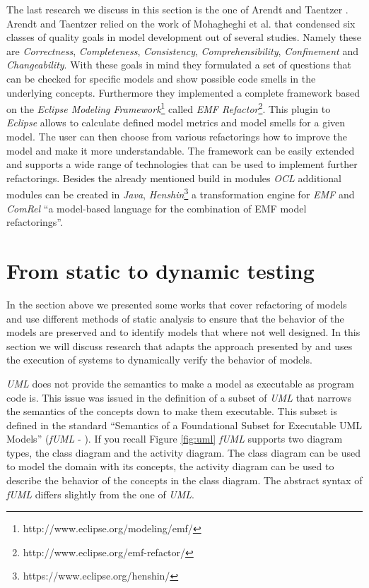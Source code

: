 \documentclass{llncs}
\begin{document}
The last research we discuss in this section is the one of Arendt and Taentzer \cite{DBLP:conf/models/ArendtTW13}. Arendt and Taentzer relied on the work of Mohagheghi et al. \cite{DBLP:journals/infsof/MohagheghiDN09} that condensed six classes of quality goals in model development out of several studies. Namely these are \textit{Correctness}, \textit{Completeness}, \textit{Consistency}, \textit{Comprehensibility}, \textit{Confinement} and \textit{Changeability}. With these goals in mind they formulated a set of questions that can be checked for specific models and show possible code smells in the underlying concepts. Furthermore they implemented a complete framework based on the \textit{Eclipse Modeling Framework}\footnote{http://www.eclipse.org/modeling/emf/} called \textit{EMF Refactor}\footnote{http://www.eclipse.org/emf-refactor/}. This plugin to \textit{Eclipse} allows to calculate defined model metrics and model smells for a given model. The user can then choose from various refactorings how to improve the model and make it more understandable. The framework can be easily extended and supports a wide range of technologies that can be used to implement further refactorings. Besides the already mentioned build in modules \textit{OCL} additional modules can be created in \textit{Java}, \textit{Henshin}\footnote{https://www.eclipse.org/henshin/} a transformation engine for \textit{EMF} and \textit{ComRel} ``a model-based language for the combination of EMF model refactorings''.

\section{From static to dynamic testing}
\label{sec:todynamics}

In the section above we presented some works that cover refactoring of models and use different methods of static analysis to ensure that the behavior of the models are preserved and to identify models that where not well designed. In this section we will discuss research that adapts the approach presented by \cite{rob99} and uses the execution of systems to dynamically verify the behavior of models.

\textit{UML} does not provide the semantics to make a model as executable as program code is. This issue was issued in the definition of a subset of \textit{UML} that narrows the semantics of the concepts down to make them executable. This subset is defined in the standard ``Semantics of a Foundational Subset for Executable UML Models'' (\textit{fUML} - \cite{man:FUML}). If you recall Figure \ref{fig:uml} \textit{fUML} supports two diagram types, the class diagram and the activity diagram. The class diagram can be used to model the domain with its concepts, the activity diagram can be used to describe the behavior of the concepts in the class diagram. The abstract syntax of \textit{fUML} differs slightly from the one of \textit{UML}.
\end{document}

